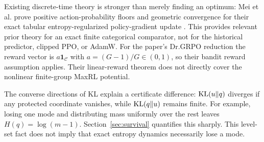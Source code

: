 Existing discrete-time theory is stronger than merely finding an optimum:
Mei et al. prove positive action-probability floors and geometric convergence
for their exact tabular entropy-regularized policy-gradient update
\cite[Lemma~13 and Theorem~5]{mei2020}. This provides relevant prior theory
for an exact finite categorical comparator, not for the historical predictor,
clipped PPO, or AdamW. For the paper's Dr.GRPO reduction the reward vector is
$a\mathbf1_{\mathcal C}$ with $a=(G-1)/G\in(0,1)$, so their bandit reward
assumption applies. Their linear-reward theorem does not directly cover the
nonlinear finite-group MaxRL potential.

The converse directions of KL explain a certificate difference:
$\operatorname{KL}(u\|q)$ diverges if any protected coordinate vanishes, while
$\operatorname{KL}(q\|u)$ remains finite. For example, losing one mode and distributing
mass uniformly over the rest leaves $H(q)=\log(m-1)$. Section~\ref{sec:survival}
quantifies this sharply. This level-set fact does not imply that exact
entropy dynamics necessarily lose a mode.
